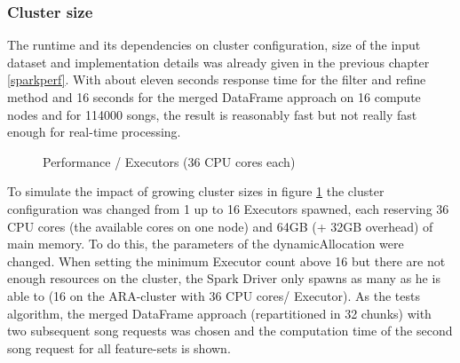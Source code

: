 \subsubsection{Cluster size}

The runtime and its dependencies on cluster configuration, size of the input dataset and implementation details was already given in the previous chapter \ref{sparkperf}. With about eleven seconds response time for the filter and refine method and 16 seconds for the merged DataFrame approach on 16 compute nodes and for 114000 songs, the result is reasonably fast but not really fast enough for real-time processing.\\ 

\FloatBarrier
\begin{figure}[htbp]
   	\centering
   	\caption{Performance / Executors (36 CPU cores each)}
   	\label{perfspark6}
\end{figure}
\FloatBarrier

\noindent To simulate the impact of growing cluster sizes in figure \ref{perfspark6} the cluster configuration was changed from 1 up to 16 Executors spawned, each reserving 36 CPU cores (the available cores on one node) and 64GB (+ 32GB overhead) of main memory. To do this, the parameters of the dynamicAllocation were changed. When setting the minimum Executor count above 16 but there are not enough resources on the cluster, the Spark Driver only spawns as many as he is able to (16 on the ARA-cluster with 36 CPU cores/ Executor). As the tests algorithm, the merged DataFrame approach (repartitioned in 32 chunks) with two subsequent song requests was chosen and the computation time of the second song request for all feature-sets is shown.\\

